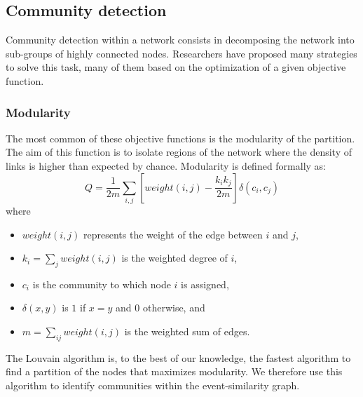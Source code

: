 \subsection{Community detection}
\label{Community detection}
Community detection within a network consists in decomposing the network into sub-groups of highly connected nodes. Researchers have proposed many strategies to solve this task, many of them based on the optimization of a given objective function. 

\subsubsection{Modularity}
The most common of these objective functions is the modularity \citep{newman2004finding} of the partition. The aim of this function is to isolate regions of the network where the density of links is higher than expected by chance. Modularity is defined formally  as:
\begin{equation}
    Q = \frac{1}{2m} \sum_{i,j}\left[weight(i,j) - \frac{k_i k_j}{2m}\right]\delta(c_i, c_j)
\end{equation}
where 
\begin{itemize}
    \item $weight(i,j)$ represents the weight of the edge between $i$ and $j$, 
    \item $k_i = \sum\limits_j weight(i,j)$ is the weighted degree of $i$,
    \item $c_i$ is the community to which node $i$ is assigned,
    \item $\delta(x, y)$ is $1$ if $x = y$ and $0$ otherwise, and
    \item $m= \sum\limits_{ij} weight(i,j)$ is the weighted sum of edges.
\end{itemize}
The Louvain algorithm \citep{blondel2008fast} is, to the best of our knowledge, the fastest algorithm to find a partition of the nodes that maximizes modularity. We therefore use this algorithm to identify communities within the event-similarity graph.

